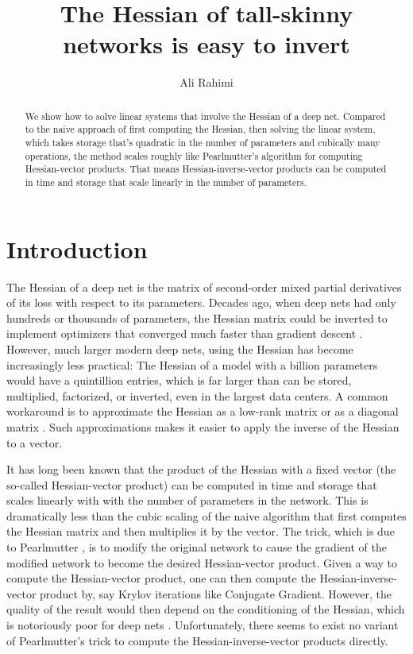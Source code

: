 \documentclass{article}
\title{The Hessian of tall-skinny networks is easy to invert}
\author{Ali Rahimi}
\begin{document}
\maketitle
\begin{abstract}
    We show how to solve linear systems that involve the Hessian of a deep net.
    Compared to the naive approach of first computing the Hessian, then solving
    the linear system, which takes storage that's quadratic in the number of
    parameters and cubically many operations, the method scales roughly like
    Pearlmutter's algorithm for computing Hessian-vector products. That means
    Hessian-inverse-vector products can be computed in time and storage that
    scale linearly in the number of parameters.
\end{abstract}

\section{Introduction}

The Hessian of a deep net is the matrix of second-order mixed partial derivatives of its loss with respect to its
parameters. Decades ago, when deep nets had only hundreds or thousands of parameters, the Hessian matrix could be
inverted to implement optimizers that converged much faster than gradient descent \cite{Watrous1987, Barnard1992}.
However, much larger modern deep nets, using the Hessian has become increasingly less practical: The Hessian of a model
with a billion parameters would have a quintillion entries, which is far larger than can be stored, multiplied,
factorized, or inverted, even in the largest data centers. A common workaround is to approximate the Hessian as a
low-rank matrix \cite{Webb1988, lbfgs-deep-net} or as a diagonal matrix \cite{becker-lecun-89, adagrad, adam}. Such
approximations makes it easier to apply the inverse of the Hessian to a vector.

It has long been known that the product of the Hessian with a fixed vector (the so-called Hessian-vector product) can
be computed in time and storage that scales linearly with with the number of parameters in the network. This is
dramatically less than the cubic scaling of the naive algorithm that first computes the Hessian matrix and then
multiplies it by the vector. The trick, which is due to Pearlmutter \cite{pearlmutter94}, is to modify the original
network to cause the gradient of the modified network to become the desired Hessian-vector product. Given a way to
compute the Hessian-vector product, one can then compute the Hessian-inverse-vector product by, say Krylov iterations
like Conjugate Gradient. However, the quality of the result would then depend on the conditioning of the Hessian, which
is notoriously poor for deep nets \cite{ying-behrooz-hessian-spectrum}. Unfortunately, there seems to exist no variant
of Pearlmutter's trick to compute the Hessian-inverse-vector products directly.
\end{document}
